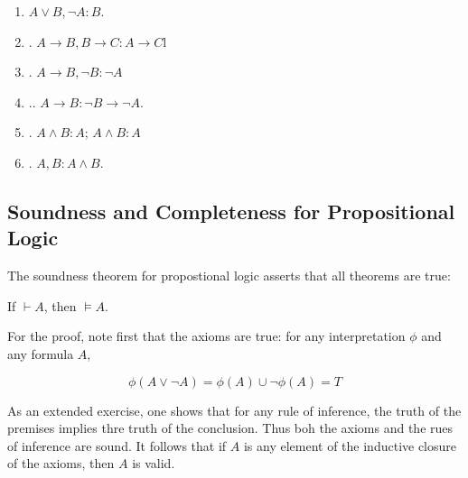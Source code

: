 
\begin{enumerate}

\item {} $A \lor B, \neg A : B$.

\item {}. $A \to B, B \to C : A \to C$l

\item {}. $A \to B, \neg B : \neg A$

\item {}.. $A \to B : \neg B \to \neg A$.

\item {}. $A \land B : A$; $A \land B : A$

\item {}. $A, B : A \land B$.

\end{enumerate}

\subsection{Soundness and Completeness for Propositional Logic}

The soundness theorem for propostional logic asserts that all theorems are true:

\begin{theorem}
If $\vdash A$, then $\models A$.
\end{theorem}

 For the proof, note first that the axioms are true: for any interpretation $\phi$ and any formula $A$,

$$\phi(A \lor \neg A) = \phi(A) \cup \neg \phi(A) = T$$

As an extended exercise, one shows that for any rule of inference, the truth of the premises implies thre truth of the conclusion.  Thus boh the axioms and the rues of inference are sound.  It follows that if $A$ is any element of the inductive closure of the axioms, then $A$ is valid.  
